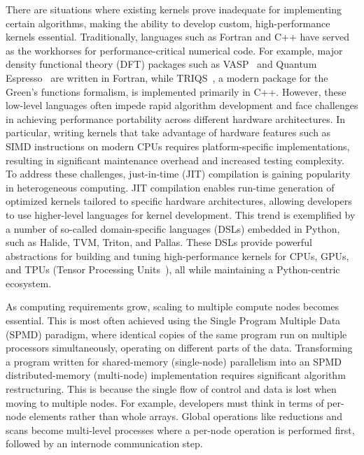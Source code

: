 There are situations where existing kernels prove inadequate for implementing certain algorithms, making the ability to develop custom, high-performance kernels essential. Traditionally, languages such as Fortran and C++ have served as the workhorses for performance-critical numerical code. For example, major density functional theory (DFT) packages such as VASP~\cite{Kresse1,Kresse2} and Quantum Espresso~\cite{Gianno_2009_QUANTUM_ESPRESS} are written in Fortran, while TRIQS~\cite{Parcol_2015_TRIQS_A_toolbo}, a modern package for the Green's functions formalism, is implemented primarily in C++. However, these low-level languages often impede rapid algorithm development and face challenges in achieving performance portability across different hardware architectures. In particular, writing kernels that take advantage of hardware features such as SIMD instructions on modern CPUs requires platform-specific implementations, resulting in significant maintenance overhead and increased testing complexity. To address these challenges, just-in-time (JIT) compilation is gaining popularity in heterogeneous computing. JIT compilation enables run-time generation of optimized kernels tailored to specific hardware architectures, allowing developers to use higher-level languages for kernel development. This trend is exemplified by a number of so-called domain-specific languages (DSLs) embedded in Python, such as Halide, TVM, Triton, and Pallas. These DSLs provide powerful abstractions for building and tuning high-performance kernels for CPUs, GPUs, and TPUs (Tensor Processing Units~), all while maintaining a Python-centric ecosystem.

As computing requirements grow, scaling to multiple compute nodes becomes essential. This is most often achieved using the Single Program Multiple Data (SPMD) paradigm, where identical copies of the same program run on multiple processors simultaneously, operating on different parts of the data. Transforming a program written for shared-memory (single-node) parallelism into an SPMD distributed-memory (multi-node) implementation requires significant algorithm restructuring. This is because the single flow of control and data is lost when moving to multiple nodes. For example, developers must think in terms of per-node elements rather than whole arrays. Global operations like reductions and scans become multi-level processes where a per-node operation is performed first, followed by an internode communication step.

